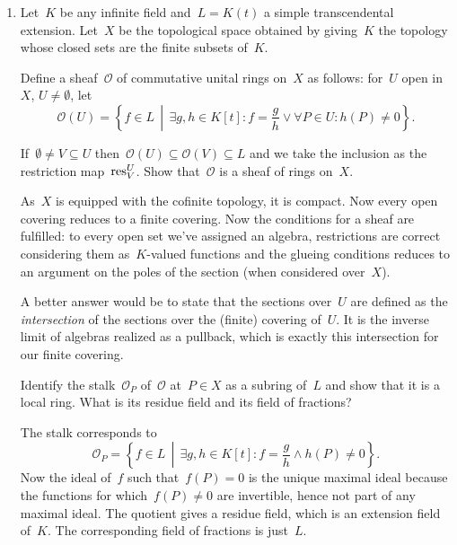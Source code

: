 \documentclass[a4paper,11pt,oneside,openany,article]{memoir}
\begin{document}
\begin{enumerate}
  \item Let~$K$ be any infinite field and~$L=K(t)$ a simple transcendental extension. Let~$X$ be the topological space obtained by giving~$K$ the topology whose closed sets are the finite subsets of~$K$.

    Define a sheaf~$\mathcal{O}$ of commutative unital rings on~$X$ as follows: for~$U$ open in~$X$, $U\neq\emptyset$, let
    \begin{equation}
      \mathcal{O}(U)=\left\{ f\in L\,\middle|\,\exists g,h\in K[t]\colon f=\frac{g}{h}\vee\forall P\in U\colon h(P)\neq 0 \right\}.
      \label{equation:rational-functions}
    \end{equation}

    If~$\emptyset\neq V\subseteq U$ then~$\mathcal{O}(U)\subseteq\mathcal{O}(V)\subseteq L$ and we take the inclusion as the restriction map~$\mathrm{res}_V^U$. Show that~$\mathcal{O}$ is a sheaf of rings on~$X$.

    \begin{solution}
      As~$X$ is equipped with the cofinite topology, it is compact. Now every open covering reduces to a finite covering. Now the conditions for a sheaf are fulfilled: to every open set we've assigned an algebra, restrictions are correct considering them as~$K$\nobreakdash-valued functions and the glueing conditions reduces to an argument on the poles of the section (when considered over~$X$).

      A better answer would be to state that the sections over~$U$ are defined as the \emph{intersection} of the sections over the (finite) covering of~$U$. It is the inverse limit of algebras realized as a pullback, which is exactly this intersection for our finite covering.
    \end{solution}

    Identify the stalk~$\mathcal{O}_P$ of~$\mathcal{O}$ at~$P\in X$ as a subring of~$L$ and show that it is a local ring. What is its residue field and its field of fractions?

    \begin{solution}
      The stalk corresponds to
      \begin{equation}
        \mathcal{O}_P=\left\{ f\in L\,\middle|\,\exists g,h\in K[t]\colon f=\frac{g}{h}\wedge h(P)\neq 0 \right\}.
      \end{equation}
      Now the ideal of~$f$ such that~$f(P)=0$ is the unique maximal ideal because the functions for which~$f(P)\neq 0$ are invertible, hence not part of any maximal ideal. The quotient gives a residue field, which is an extension field of~$K$. The corresponding field of fractions is just~$L$.
    \end{solution}


\end{enumerate}
\end{document}
